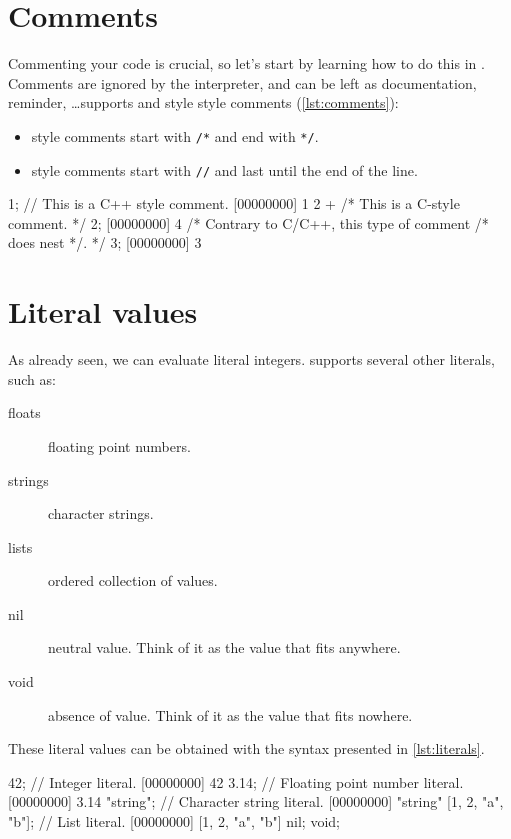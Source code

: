 \section{Comments}

Commenting your code is crucial, so let's start by learning how to do
this in \urbi. Comments are ignored by the interpreter, and
can be left as documentation, reminder, \ldots \urbi supports \C and
\Cxx style style comments (\autoref{lst:comments}):

\begin{itemize}
\item \C style comments start with \texttt{/*} and end with \texttt{*/}.
\item \Cxx style comments start with \texttt{//} and last until the
  end of the line.
\end{itemize}


\begin{urbiscript}[caption=Comments in \urbi, label=lst:comments]
1; // This is a C++ style comment.
[00000000] 1
2 + /* This is a C-style comment. */ 2;
[00000000] 4
/* Contrary to C/C++, this type of comment /* does nest */. */
3;
[00000000] 3
\end{urbiscript}


\section{Literal values}

As already seen, we can evaluate literal integers. \urbi supports
several other literals, such as:

\begin{description}
\item[floats] floating point numbers.
\item[strings] character strings.
\item[lists] ordered collection of values.
\item[nil] neutral value. Think of it as the value that fits anywhere.
\item[void] absence of value. Think of it as the value that fits nowhere.
\end{description}

These literal values can be obtained with the syntax presented in
\autoref{lst:literals}.

\begin{urbiscript}[caption=Literals,label=lst:literals]
42; // Integer literal.
[00000000] 42
3.14; // Floating point number literal.
[00000000] 3.14
"string"; // Character string literal.
[00000000] "string"
[1, 2, "a", "b"]; // List literal.
[00000000] [1, 2, "a", "b"]
nil;
void;
\end{urbiscript}

